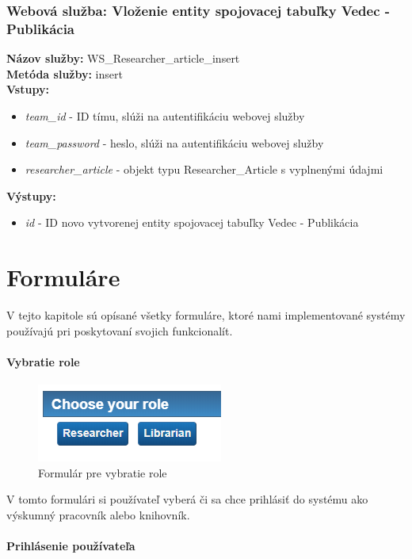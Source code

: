 \documentclass[10pt,oneside,slovak,a4paper]{article}
\begin{document}
\subsubsection{Webová služba: Vloženie entity spojovacej tabuľky Vedec - Publikácia}
\textbf{Názov služby:} WS\_Researcher\_article\_insert\\
\textbf{Metóda služby:} insert\\
\textbf{Vstupy:}
	\begin{itemize}
		\item \textit{team\_id} - ID tímu, slúži na autentifikáciu webovej služby
		\item \textit{team\_password} - heslo, slúži na autentifikáciu webovej služby
		\item \textit{researcher\_article} - objekt typu Researcher\_Article s vyplnenými údajmi
	\end{itemize}
\textbf{Výstupy:}
	\begin{itemize}
		\item \textit{id} - ID novo vytvorenej entity spojovacej tabuľky Vedec - Publikácia
	\end{itemize}

\section{Formuláre}
V tejto kapitole sú opísané všetky formuláre, ktoré nami implementované systémy používajú pri poskytovaní svojich funkcionalít.

\paragraph{Vybratie role}

\begin{figure} [H]
\centering
\includegraphics[scale=0.4]{forms/Coachforchoosingrole.png} 
\caption{Formulár pre vybratie role}
\end{figure}

V tomto formulári si používateľ vyberá či sa chce prihlásiť do systému ako výskumný pracovník alebo knihovník.

\paragraph{Prihlásenie používateľa}
\end{document}
